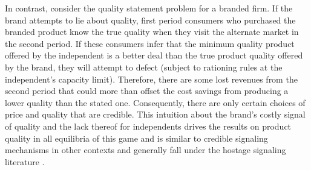 \documentclass[12pt, leqno]{article}
\begin{document}
In contrast, consider the quality statement problem for a branded firm. If the brand attempts to lie about quality, first period consumers who purchased the branded product  know the true quality when they visit the alternate market in the second period. If these consumers infer that the minimum quality product offered by the independent is a better deal than the true product quality offered by the brand, they will attempt to defect (subject to rationing rules at the independent's capacity limit). Therefore, there are some lost revenues from the second period that could more than offset the cost savings from producing a lower quality than the stated one. Consequently, there are only certain choices of price and quality that are credible. This intuition about the brand's costly signal of quality and the lack thereof for independents drives the results on product quality in all equilibria of this game and is similar to credible signaling mechanisms in other contexts \citep{spence1978job,milgrom1986price} and generally fall under the hostage signaling literature \citep{williamson1983credible}.
\end{document}
